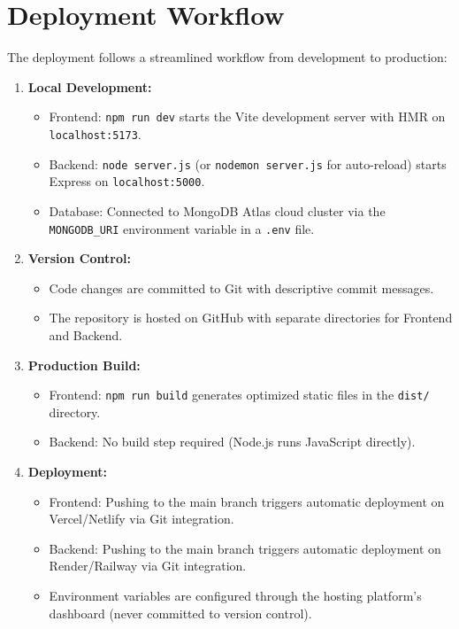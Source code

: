 \section{Deployment Workflow}
The deployment follows a streamlined workflow from development to production:

\begin{enumerate}
    \item \textbf{Local Development:}
    \begin{itemize}
        \item Frontend: \texttt{npm run dev} starts the Vite development server with HMR on \texttt{localhost:5173}.
        \item Backend: \texttt{node server.js} (or \texttt{nodemon server.js} for auto-reload) starts Express on \texttt{localhost:5000}.
        \item Database: Connected to MongoDB Atlas cloud cluster via the \texttt{MONGODB\_URI} environment variable in a \texttt{.env} file.
    \end{itemize}
    \item \textbf{Version Control:}
    \begin{itemize}
        \item Code changes are committed to Git with descriptive commit messages.
        \item The repository is hosted on GitHub with separate directories for Frontend and Backend.
    \end{itemize}
    \item \textbf{Production Build:}
    \begin{itemize}
        \item Frontend: \texttt{npm run build} generates optimized static files in the \texttt{dist/} directory.
        \item Backend: No build step required (Node.js runs JavaScript directly).
    \end{itemize}
    \item \textbf{Deployment:}
    \begin{itemize}
        \item Frontend: Pushing to the main branch triggers automatic deployment on Vercel/Netlify via Git integration.
        \item Backend: Pushing to the main branch triggers automatic deployment on Render/Railway via Git integration.
        \item Environment variables are configured through the hosting platform's dashboard (never committed to version control).
    \end{itemize}
\end{enumerate}

